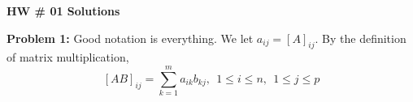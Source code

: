\documentclass[letterpaper]{article}
\begin{document}
\newcommand{\trace}{\mathrm{trace}}
\newcommand{\real}{\mathbb R}  %
\newcommand{\nat}{\mathbb R}   %
\newcommand{\cp}{\mathbb C}    %
\newcommand{\ds}{\displaystyle}
\newcommand{\mf}[2]{\frac{\ds #1}{\ds #2}}
\newcommand{\book}[2]{{Luenberger, Page~#1, }{Prob.~#2}}
\newcommand{\spanof}[1]{\textrm{span} \{ #1 \}}
\parindent 0pt


\begin{center}
{\large \bf HW \# 01 Solutions}
\end{center}

\vspace*{1cm}


\noindent \textbf{Problem 1:}  Good notation is everything. We let $a_{ij}=[A]_{ij}$. By the definition of matrix multiplication,
$$[AB]_{ij} = \sum \limits_{k=1}^{m} a_{ik} b_{kj},~~1\le i\le n,~~1 \le j \le p $$
\end{document}
